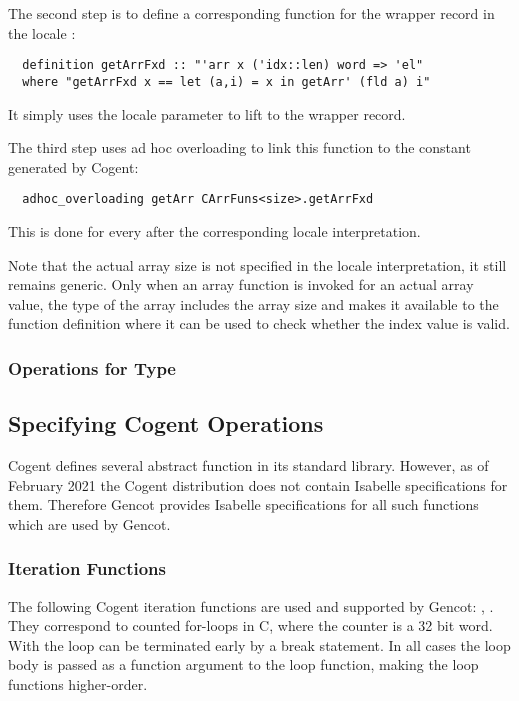The second step is to define a corresponding function for the wrapper record in the locale :
\begin{verbatim}
  definition getArrFxd :: "'arr x ('idx::len) word => 'el"
  where "getArrFxd x == let (a,i) = x in getArr' (fld a) i"
\end{verbatim}
It simply uses the locale parameter  to lift  to the wrapper record.

The third step uses ad hoc overloading to link this function to the constant generated by Cogent:
\begin{verbatim}
  adhoc_overloading getArr CArrFuns<size>.getArrFxd
\end{verbatim}
This is done for every  after the corresponding locale interpretation.

Note that the actual array size is not specified in the locale interpretation, it still remains generic.
Only when an array function is invoked for an actual array value, the type of the array includes the array 
size and makes it available to the function definition where it can be used to check whether the index value
is valid.

\subsubsection{Operations for Type }

\subsection{Specifying Cogent Operations}
\label{design-isabelle-cogentops}

Cogent defines several abstract function in its standard library. However, as of February 2021 the Cogent distribution
does not contain Isabelle specifications for them. Therefore Gencot provides Isabelle specifications for all such
functions which are used by Gencot.

\subsubsection{Iteration Functions}

The following Cogent iteration functions are used and supported by Gencot: , . They 
correspond to counted for-loops in C, where the counter is a 32 bit word. With  the loop can be terminated 
early by a break statement. In all cases the loop body is passed as a function argument to the loop function, making
the loop functions higher-order.

